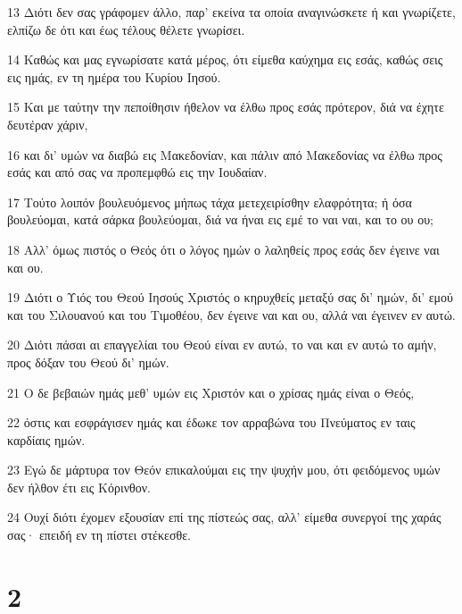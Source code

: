 \par 13 Διότι δεν σας γράφομεν άλλο, παρ' εκείνα τα οποία αναγινώσκετε ή και γνωρίζετε, ελπίζω δε ότι και έως τέλους θέλετε γνωρίσει.
\par 14 Καθώς και μας εγνωρίσατε κατά μέρος, ότι είμεθα καύχημα εις εσάς, καθώς σεις εις ημάς, εν τη ημέρα του Κυρίου Ιησού.
\par 15 Και με ταύτην την πεποίθησιν ήθελον να έλθω προς εσάς πρότερον, διά να έχητε δευτέραν χάριν,
\par 16 και δι' υμών να διαβώ εις Μακεδονίαν, και πάλιν από Μακεδονίας να έλθω προς εσάς και από σας να προπεμφθώ εις την Ιουδαίαν.
\par 17 Τούτο λοιπόν βουλευόμενος μήπως τάχα μετεχειρίσθην ελαφρότητα; ή όσα βουλεύομαι, κατά σάρκα βουλεύομαι, διά να ήναι εις εμέ το ναι ναι, και το ου ου;
\par 18 Αλλ' όμως πιστός ο Θεός ότι ο λόγος ημών ο λαληθείς προς εσάς δεν έγεινε ναι και ου.
\par 19 Διότι ο Υιός του Θεού Ιησούς Χριστός ο κηρυχθείς μεταξύ σας δι' ημών, δι' εμού και του Σιλουανού και του Τιμοθέου, δεν έγεινε ναι και ου, αλλά ναι έγεινεν εν αυτώ.
\par 20 Διότι πάσαι αι επαγγελίαι του Θεού είναι εν αυτώ, το ναι και εν αυτώ το αμήν, προς δόξαν του Θεού δι' ημών.
\par 21 Ο δε βεβαιών ημάς μεθ' υμών εις Χριστόν και ο χρίσας ημάς είναι ο Θεός,
\par 22 όστις και εσφράγισεν ημάς και έδωκε τον αρραβώνα του Πνεύματος εν ταις καρδίαις ημών.
\par 23 Εγώ δε μάρτυρα τον Θεόν επικαλούμαι εις την ψυχήν μου, ότι φειδόμενος υμών δεν ήλθον έτι εις Κόρινθον.
\par 24 Ουχί διότι έχομεν εξουσίαν επί της πίστεώς σας, αλλ' είμεθα συνεργοί της χαράς σας· επειδή εν τη πίστει στέκεσθε.

\chapter{2}

